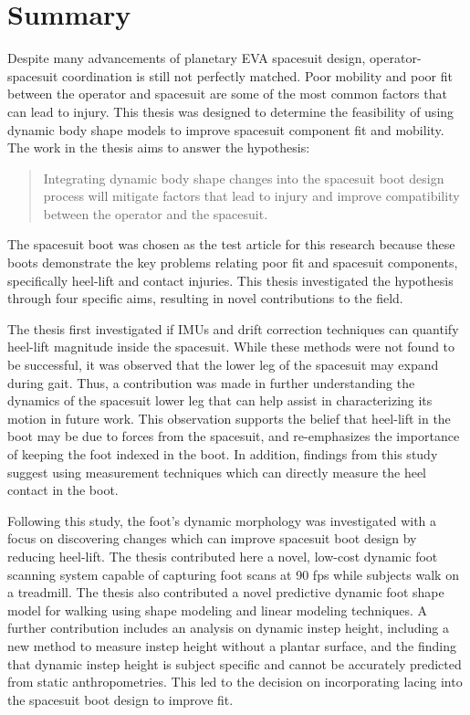 \documentclass[defaultstyle,11pt]{thesis}
\begin{document}
\hypertarget{summary-7}{%
\chapter{Summary}\label{summary-7}}

Despite many advancements of planetary EVA spacesuit design, operator-spacesuit coordination is still not perfectly matched.
Poor mobility and poor fit between the operator and spacesuit are some of the most common factors that can lead to injury.
This thesis was designed to determine the feasibility of using dynamic body shape models to improve spacesuit component fit and mobility.
The work in the thesis aims to answer the hypothesis:

\begin{quote}
Integrating dynamic body shape changes into the spacesuit boot design process will mitigate factors that lead to injury and improve compatibility between the operator and the spacesuit.
\end{quote}

The spacesuit boot was chosen as the test article for this research because these boots demonstrate the key problems relating poor fit and spacesuit components, specifically heel-lift and contact injuries.
This thesis investigated the hypothesis through four specific aims, resulting in novel contributions to the field.

The thesis first investigated if IMUs and drift correction techniques can quantify heel-lift magnitude inside the spacesuit.
While these methods were not found to be successful, it was observed that the lower leg of the spacesuit may expand during gait.
Thus, a contribution was made in further understanding the dynamics of the spacesuit lower leg that can help assist in characterizing its motion in future work.
This observation supports the belief that heel-lift in the boot may be due to forces from the spacesuit, and re-emphasizes the importance of keeping the foot indexed in the boot.
In addition, findings from this study suggest using measurement techniques which can directly measure the heel contact in the boot.

Following this study, the foot's dynamic morphology was investigated with a focus on discovering changes which can improve spacesuit boot design by reducing heel-lift.
The thesis contributed here a novel, low-cost dynamic foot scanning system capable of capturing foot scans at 90 fps while subjects walk on a treadmill.
The thesis also contributed a novel predictive dynamic foot shape model for walking using shape modeling and linear modeling techniques.
A further contribution includes an analysis on dynamic instep height, including a new method to measure instep height without a plantar surface, and the finding that dynamic instep height is subject specific and cannot be accurately predicted from static anthropometries.
This led to the decision on incorporating lacing into the spacesuit boot design to improve fit.
\end{document}
